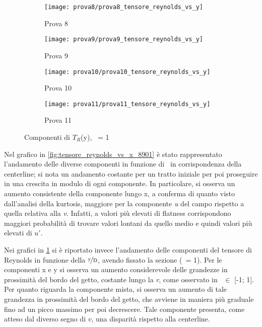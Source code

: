 \documentclass{article} %
\newcommand{\xd}{\nicefrac{\textrm{x}}{\textrm{D}}\ }
\newcommand{\yd}{\nicefrac{\textrm{y}}{\textrm{D}}\ }
\begin{document}
\begin{figure}[h!]
	\centering
	\begin{subfigure}[b]{0.24\textwidth}
		\texttt{[image: prova8/prova8\_tensore\_reynolds\_vs\_y]}
		\caption{Prova 8}
	\end{subfigure}
	\begin{subfigure}[b]{0.24\textwidth}
		\texttt{[image: prova9/prova9\_tensore\_reynolds\_vs\_y]}
		\caption{Prova 9}
	\end{subfigure}
	\begin{subfigure}[b]{0.24\textwidth}
		\texttt{[image: prova10/prova10\_tensore\_reynolds\_vs\_y]}
		\caption{Prova 10}
	\end{subfigure}
	\begin{subfigure}[b]{0.24\textwidth}
		\texttt{[image: prova11/prova11\_tensore\_reynolds\_vs\_y]}
		\caption{Prova 11}
	\end{subfigure}
	\caption{Componenti di $T_R$(y), \xd= 1}
	\label{fig:tensore_reynolds_vs_y_8901}
\end{figure}
Nel grafico in \cref{fig:tensore_reynolds_vs_x_8901} è stato rappresentato l'andamento delle diverse componenti in funzione di \xd in corrispondenza della centerline; si nota un andamento costante per un tratto iniziale per poi proseguire in una crescita in modulo di ogni componente. In particolare, si osserva un aumento consistente della componente lungo x, a conferma di quanto visto dall'analisi della kurtosis, maggiore per la componente \textit{u} del campo rispetto a quella relativa alla \textit{v}. Infatti, a valori più elevati di flatness corrispondono maggiori probabilità di trovare valori lontani da quello medio e quindi valori più elevati di $u'$.\par
Nei grafici in \cref{fig:tensore_reynolds_vs_y_8901} si è riportato invece l'andamento delle componenti del tensore di Reynolds in funzione della $\nicefrac{\textrm{y}}{\textrm{D}}$, avendo fissato la sezione (\xd = 1). Per le componenti x e y si osserva un aumento considerevole delle grandezze in prossimità del bordo del getto, costante lungo la \textit{r}, come osservato in \yd $\in$ [-1; 1]. Per quanto riguarda la componente mista, si osserva un aumento di tale grandezza in prossimità del bordo del getto, che avviene in maniera più graduale fino ad un picco massimo per poi decrescere. Tale componente presenta, come atteso dal diverso segno di $v$, una disparità rispetto alla centerline.
\end{document}
